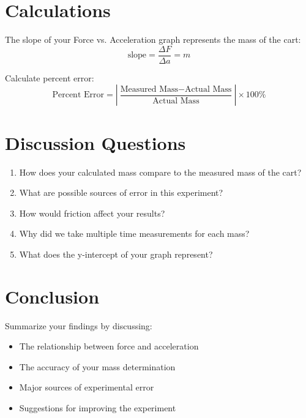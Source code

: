 \documentclass[12pt]{article}
\begin{document}
\section*{Calculations}
The slope of your Force vs. Acceleration graph represents the mass of the cart:
$$\text{slope} = \frac{\Delta F}{\Delta a} = m$$

Calculate percent error:
$$\text{Percent Error} = \left|\frac{\text{Measured Mass} - \text{Actual Mass}}{\text{Actual Mass}}\right| \times 100\%$$

\section*{Discussion Questions}
\begin{enumerate}[label=\arabic*.]
\item How does your calculated mass compare to the measured mass of the cart?
\item What are possible sources of error in this experiment?
\item How would friction affect your results?
\item Why did we take multiple time measurements for each mass?
\item What does the y-intercept of your graph represent?
\end{enumerate}

\section*{Conclusion}
Summarize your findings by discussing:
\begin{itemize}
\item The relationship between force and acceleration
\item The accuracy of your mass determination
\item Major sources of experimental error
\item Suggestions for improving the experiment
\end{itemize}
\end{document}
